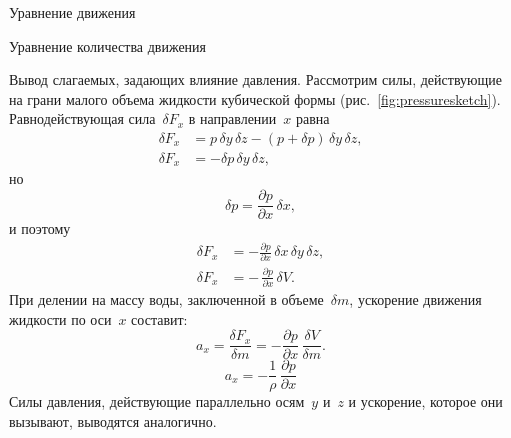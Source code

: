 \begin{chapter}{Уравнение движения}
\begin{section}{Уравнение количества движения}
\begin{paragraph}{Вывод слагаемых, задающих влияние давления.}
Рассмотрим силы, действующие на грани малого объема жидкости 
кубической формы (рис.~\ref{fig:pressuresketch}).
Равнодействующая сила~$\delta F_x$ в направлении~$x$ равна
\begin{align*}
\delta F_x &= p\,\delta{y}\,\delta{z} - (p + \delta{p})\,\delta{y}\,\delta{z},\\
\delta F_x &= - \delta{p}\,\delta{y}\,\delta{z},
\end{align*}
но
\begin{displaymath}
\delta{p} = \frac{\partial{p}}{\partial{x}}\,\delta{x},
\end{displaymath}
и поэтому
\begin{align*}
\delta F_x &= - \frac{\partial{p}}{\partial{x}}\,\delta{x}\,\delta{y}\,\delta{z},\\
\delta F_x &=-\,\frac{\partial{p}}{\partial{x}}\, \delta{V}.
\end{align*}
При делении на массу воды, заключенной в объеме~$\delta m$, ускорение
движения жидкости по оси~$x$ составит:
\begin{equation*}
a_x = \frac{{\delta F_x}}{\delta{m}} 
    = - \frac{\partial{p}}{\partial{x}}\,\frac{\delta{V}}{\delta{m}}.
\end{equation*}
\begin{equation}
\boxed{a_x = - \frac{1}{\rho}\,\frac{\partial{p}}{\partial{x}}}
\end{equation}
Силы давления, действующие параллельно осям~$y$ и~$z$ и ускорение, которое 
они вызывают, выводятся аналогично.
%

\end{paragraph}
\end{section}
\end{chapter}
